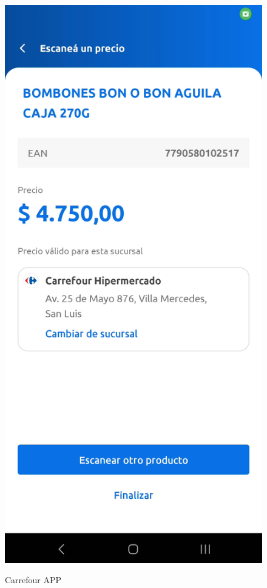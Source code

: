 \documentclass[twoside]{article}
\begin{document}
\begin{figure}[H]
\begin{center}
{        \includegraphics[scale=0.12]{Screenshot_20240624_232414_Gallery.jpg}
        \label{Imagen-Londres}}
    \caption{Carrefour APP}
    \label{Figura-Ciudades}
  \end{center}
\end{figure}
\end{document}

